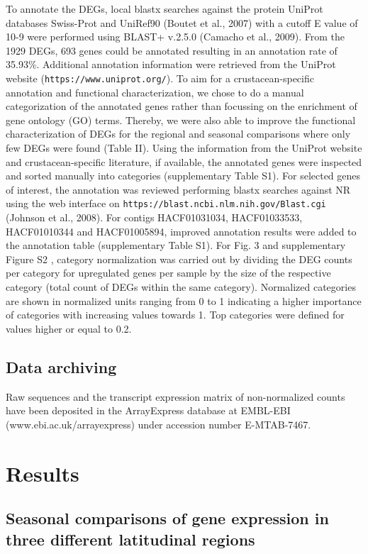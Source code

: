To annotate the DEGs, local blastx searches against the protein UniProt
databases Swiss-Prot and UniRef90 (Boutet et al., 2007) with a cutoff E value
of 10-9 were performed using BLAST+ v.2.5.0 (Camacho et al., 2009). From the
1929 DEGs, 693 genes could be annotated resulting in an annotation rate of
35.93\%. Additional annotation information were retrieved from the UniProt
website (\texttt{https://www.uniprot.org/}). To aim for a crustacean-specific annotation
and functional characterization, we chose to do a manual categorization of the
annotated genes rather than focussing on the enrichment of gene ontology (GO)
terms. Thereby, we were also able to improve the functional characterization of
DEGs for the regional and seasonal comparisons where only few DEGs were found
(Table II). Using the information from the UniProt website and
crustacean-specific literature, if available, the annotated genes were
inspected and sorted manually into categories (supplementary Table S1). For
selected genes of interest, the annotation was reviewed performing blastx
searches against NR using the web interface on
\texttt{https://blast.ncbi.nlm.nih.gov/Blast.cgi}  (Johnson et al., 2008). For
contigs HACF01031034, HACF01033533, HACF01010344 and HACF01005894, improved
annotation results were added to the annotation table (supplementary Table S1).
For Fig. 3 and supplementary Figure S2 , category normalization was carried out
by dividing the DEG counts per category for upregulated genes per sample by the
size of the respective category (total count of DEGs within the same category).
Normalized categories are shown in normalized units ranging from 0 to 1
indicating a higher importance of categories with increasing values towards 1.
Top categories were defined for values higher or equal to 0.2.

\subsection*{Data archiving}

Raw sequences and the transcript expression matrix of non-normalized counts
have been deposited in the ArrayExpress database at EMBL-EBI
(www.ebi.ac.uk/arrayexpress) under accession number E-MTAB-7467.  

\section{Results}

\subsection*{Seasonal comparisons of gene expression in three different latitudinal regions}

